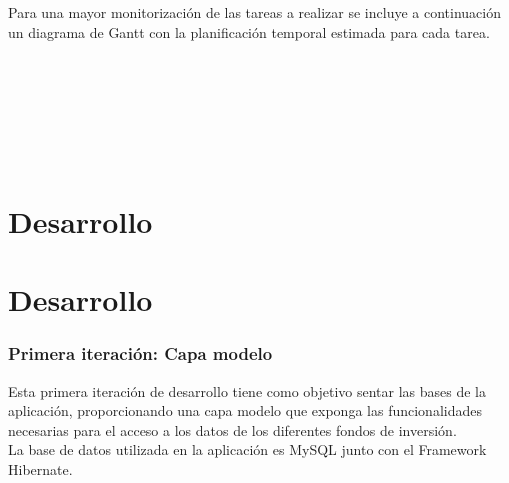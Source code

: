 \documentclass[12pt, a4paper]{article}
\def\GanttHeader#1#2#3#4{%
	\pgfmathparse{(#1-#2-#3)/#4}
	\tikzset{y=7mm, task number/.style={left, font=\bfseries},
		task description/.style={text width=#3,  right, draw=none,
			font=\sffamily, xshift=#2,
			minimum height=2em},
		gantt bar/.style={draw=black, fill=blue!30},
		help lines/.style={draw=black!30, dashed},
		x=\pgfmathresult pt
	}
	\def\totalmonths{#4}
	\node (Header) [task description] at (0,0) {\textbf{\large Tareas}};
	\begin{scope}[shift=($(Header.south east)$)]
		\foreach \x in {1,...,#4}
		\node[above] at (\x,0) {\footnotesize\x};
	\end{scope}
}
\def\Task#1#2#3#4{%
	\node[task number] at ($(Header.west) + (0, -#1)$) {#1};
	\node[task description] at (0,-#1) {#2};
	\begin{scope}[shift=($(Header.south east)$)]
		\draw (0,-#1) rectangle +(\totalmonths, 1);
		\foreach \x in {1,...,\totalmonths}
		\draw[help lines] (\x,-#1) -- +(0,1);
		\filldraw[gantt bar] ($(#3, -#1+0.2)$) rectangle +(#4,0.6);
	\end{scope}
}
\newcommand*\parttitle{}
\let\origpart\part
\renewcommand*{\part}[2][]{%
	\ifx\\#1\\%
	\origpart{#2}%
	\renewcommand*\parttitle{#2}%
	\else
	\origpart[#1]{#2}%
	\renewcommand*\parttitle{#1}%
	\fi
}
\begin{document}
Para una mayor monitorización de las tareas a realizar se incluye a continuación un diagrama de Gantt con la planificación temporal estimada para cada tarea.

\newpage
\begin{landscape}
	
\\

\\



\end{landscape} 

\newpage


\part{Desarrollo}
\section{Primera iteración: Capa modelo}

Esta primera iteración de desarrollo tiene como objetivo sentar las bases de la aplicación, proporcionando una capa modelo que exponga las funcionalidades necesarias para el acceso a los datos de los diferentes fondos de inversión.\\

La base de datos utilizada en la aplicación es MySQL junto con el Framework Hibernate.
\end{document}
